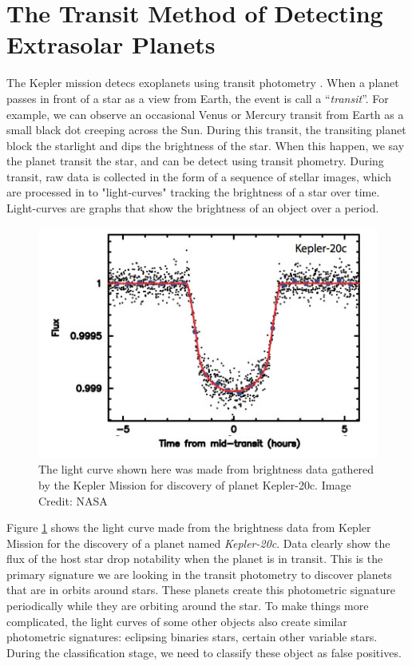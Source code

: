 \section{The Transit Method of Detecting Extrasolar Planets}

The Kepler mission detecs exoplanets using transit photometry \cite{2000ApJ...529L..45C}. When a planet passes in front of a star as a view from Earth, the event is call a ``{\emph {transit}}''. For example, we can observe an occasional Venus or Mercury transit from Earth as a small black dot creeping across the Sun. During this transit, the transiting planet block the starlight and dips the brightness of the star. When this happen, we say the planet transit the star, and can be detect using transit phometry. During transit, raw data is collected in the form of a sequence of stellar images, which are processed in to "light-curves" tracking the brightness of a star over time. Light-curves are graphs that show the brightness of an object over a period. 

\begin{figure}[!h]
\begin{center}
        \includegraphics[width=0.6\textheight]{img/k20c.jpg}
        \caption{The light curve shown here was made from brightness data gathered by the Kepler Mission for discovery of planet Kepler-20c.
Image Credit: NASA}  \label{fig:lightcurve}
\end{center}
\end{figure}

Figure \ref{fig:lightcurve} shows the light curve made from the brightness data from Kepler Mission for the discovery of a planet named \emph{Kepler-20c}. Data clearly show the flux of the host star drop notability when the planet is in transit. This is the primary signature we are looking in the transit photometry to discover planets that are in orbits around stars. These planets create this photometric signature periodically while they are orbiting around the star. To make things more complicated, the light curves of some other objects also create similar photometric signatures: eclipsing binaries stars, certain other variable stars. During the classification stage, we need to classify these object as false positives. 


